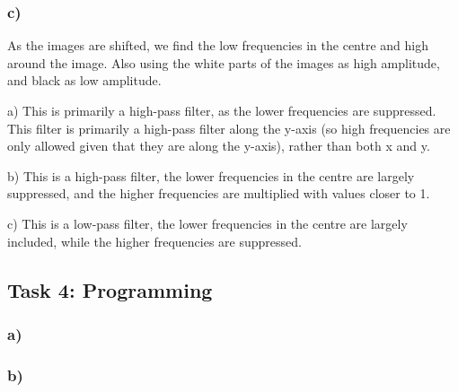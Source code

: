 \subsubsection*{c)}
As the images are shifted, we find the low frequencies in the centre and high around the image. Also using the white parts of the images as high amplitude, and black as low amplitude. 

a)
This is primarily a high-pass filter, as the lower frequencies are suppressed. This filter is primarily a high-pass filter along the y-axis (so high frequencies are only allowed given that they are along the y-axis), rather than both x and y. 

b)
This is a high-pass filter, the lower frequencies in the centre are largely suppressed, and the higher frequencies are multiplied with values closer to 1. 

c)
This is a low-pass filter, the lower frequencies in the centre are largely included, while the higher frequencies are suppressed.

\newpage
\subsection{Task 4: Programming}
\subsubsection*{a)}

\subsubsection*{b)}

